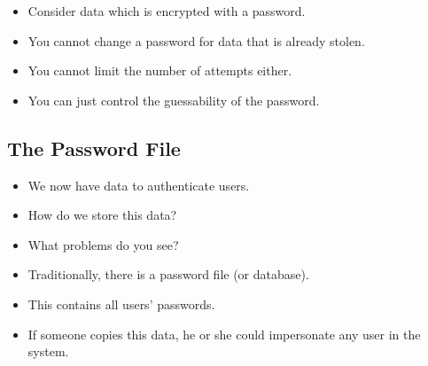 \begin{frame}
  \begin{remark}
    \begin{itemize}
      \item Consider data which is encrypted with a password.
      \item You cannot change a password for data that is already stolen.
      \item You cannot limit the number of attempts either.
      \item You can just control the guessability of the password.
    \end{itemize}
  \end{remark}
\end{frame}

\subsection{The Password File}

\begin{frame}
  \begin{exercise}
    \begin{itemize}
      \item We now have data to authenticate users.
      \item How do we store this data?
      \item What problems do you see?
    \end{itemize}
  \end{exercise}
\end{frame}

\begin{frame}
  \begin{example}
    \begin{itemize}
      \item Traditionally, there is a password file (or database).
      \item This contains all users' passwords.

        \pause{}

      \item If someone copies this data, he or she could impersonate any user 
        in the system.
    \end{itemize}
  \end{example}
\end{frame}

